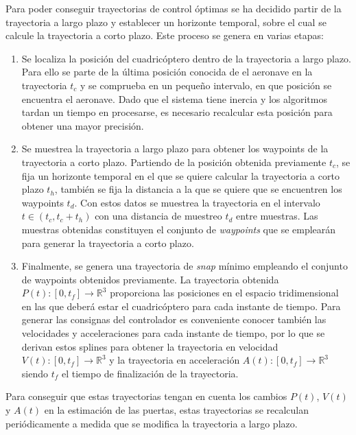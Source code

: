 Para poder conseguir trayectorias de control óptimas se ha decidido partir de la trayectoria a largo plazo y establecer un horizonte temporal, sobre el cual se calcule la trayectoria a corto plazo. Este proceso se genera en varias etapas:
\begin{enumerate}
	\item Se localiza la posición del cuadricóptero dentro de la trayectoria a largo plazo. Para ello se parte de la última posición conocida de el aeronave en la trayectoria $t_c$ y se comprueba en un pequeño intervalo, en que posición se encuentra el aeronave. Dado que el sistema tiene inercia y los algoritmos tardan un tiempo en procesarse, es necesario recalcular esta posición para obtener una mayor precisión.
	
	\item Se muestrea la trayectoria a largo plazo para obtener los waypoints de la trayectoria a corto plazo. Partiendo de la posición obtenida previamente $t_c$, se fija un horizonte temporal en el que se quiere calcular la trayectoria a corto plazo $t_h$, también se fija la distancia a la que se quiere que se encuentren los waypoints $t_d$. Con estos datos se  muestrea la trayectoria en el intervalo $t \in (t_c, t_c + t_h)$ con una distancia de muestreo $t_d$ entre muestras. Las muestras obtenidas constituyen el conjunto de \textit{waypoints} que se emplearán para generar la trayectoria a corto plazo.
	
	\item Finalmente, se genera una trayectoria de \textit{snap} mínimo empleando el conjunto de waypoints obtenidos previamente. La trayectoria obtenida $P(t) :[0,t_f] \rightarrow \mathbb{R}^3$ proporciona las posiciones en el espacio tridimensional en las que deberá estar el cuadricóptero para cada instante de tiempo. Para generar las consignas del controlador es conveniente conocer también las velocidades y acceleraciones para cada instante de tiempo, por lo que se derivan estos splines para obtener la trayectoria en velocidad $V(t) :[0,t_f] \rightarrow \mathbb{R}^3$ y la trayectoria en acceleración  $A(t) :[0,t_f] \rightarrow \mathbb{R}^3$ siendo $t_f$ el tiempo de finalización de la trayectoria.
\end{enumerate}

Para conseguir que estas trayectorias tengan en cuenta los cambios $P(t)$, $V(t)$ y $A(t)$ en la estimación de las puertas, estas trayectorias se recalculan periódicamente a medida que se modifica la trayectoria a largo plazo.


